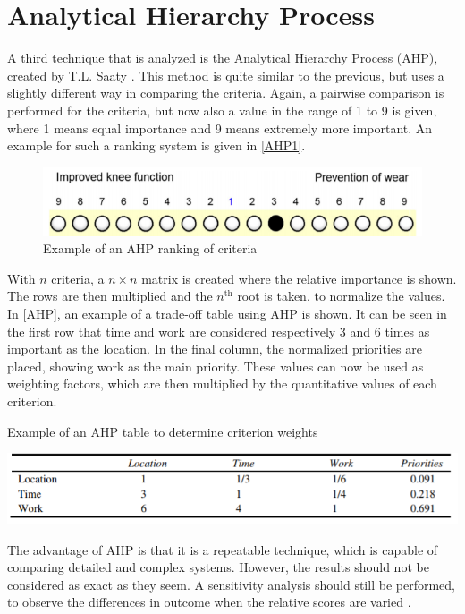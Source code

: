 \section{Analytical Hierarchy Process}
A third technique that is analyzed is the Analytical Hierarchy Process (AHP), created by T.L. Saaty \cite{AHP}. This method is quite similar to the previous, but uses a slightly different way in comparing the criteria. Again, a pairwise comparison is performed for the criteria, but now also a value in the range of 1 to 9 is given, where 1 means equal importance and 9 means extremely more important. An example for such a ranking system is given in \autoref{AHP1}.

\begin{figure}[H]
    \centering
    \includegraphics[width=0.75\linewidth]{Figures/AHP1.PNG}
    \captionsetup{justification=centering}
    \caption{Example of an AHP ranking of criteria \cite{AHPtut}}
    \label{AHP1}
\end{figure}

With $n$ criteria, a $n \times n$ matrix is created where the relative importance is shown. The rows are then multiplied and the $n^\text{th}$ root is taken, to normalize the values. In \autoref{AHP}, an example of a trade-off table using AHP is shown. It can be seen in the first row that time and work are considered respectively 3 and 6 times as important as the location. In the final column, the normalized priorities are placed, showing work as the main priority. These values can now be used as weighting factors, which are then multiplied by the quantitative values of each criterion. 

\begin{table}[H]
    \centering
    \captionsetup{justification=centering}
    \caption{Example of an AHP table to determine criterion weights \cite{AHP}} \vspace{-0.2cm}
    \label{AHP}
    \includegraphics[width=0.75\linewidth]{Figures/AHP.PNG}
\end{table}

The advantage of AHP is that it is a repeatable technique, which is capable of comparing detailed and complex systems. However, the results should not be considered as exact as they seem. A sensitivity analysis should still be performed, to observe the differences in outcome when the relative scores are varied \cite{tradeoff}. 

